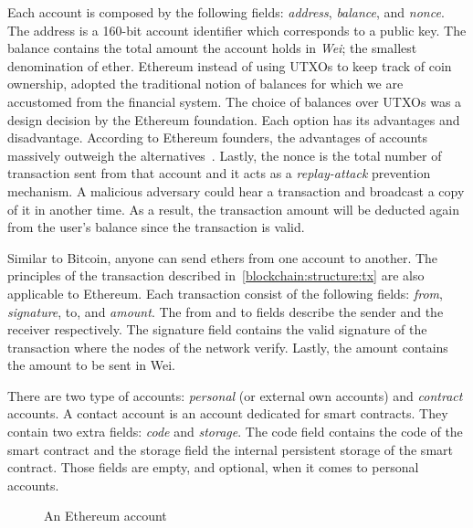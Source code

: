 Each account is composed by the following fields: \textit{address}, \textit{balance}, and \textit{nonce}. The address is a 160-bit account identifier which corresponds to a public key. The balance contains the total amount the account holds in \textit{Wei}; the smallest denomination of ether. Ethereum instead of using UTXOs to keep track of coin ownership, adopted the traditional notion of balances for which we are accustomed from the financial system. The choice of balances over UTXOs was a design decision by the Ethereum foundation. Each option has its advantages and disadvantage. According to Ethereum founders, the advantages of accounts massively outweigh the alternatives~\cite{eth_design}. Lastly, the nonce is the total number of transaction sent from that account and it acts as a \textit{replay-attack} prevention mechanism. A malicious adversary could hear a transaction and broadcast a copy of it in another time. As a result, the transaction amount will be deducted again from the user's balance since the transaction is valid.

Similar to Bitcoin, anyone can send ethers from one account to another. The principles of the transaction described in~\ref{blockchain:structure:tx} are also applicable to Ethereum. Each transaction consist of the following fields: \textit{from}, \textit{signature}, to, and \textit{amount}. The from and to fields describe the sender and the receiver respectively. The signature field contains the valid signature of the transaction where the nodes of the network verify. Lastly, the amount contains the amount to be sent in Wei.

There are two type of accounts: \textit{personal} (or external own accounts) and \textit{contract} accounts. A contact account is an account dedicated for smart contracts. They contain two extra fields: \textit{code} and \textit{storage}. The code field contains the code of the smart contract and the storage field the internal persistent storage of the smart contract. Those fields are empty, and optional, when it comes to personal accounts.

\begin{figure}[!ht]
  \centering
  \caption{An Ethereum account}
  \label{fig:eth_account}
\end{figure}

